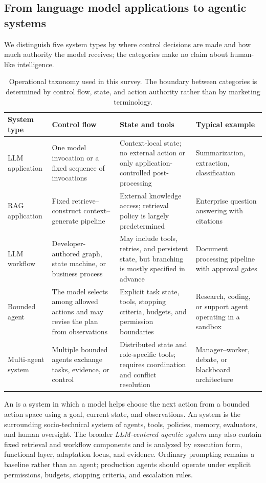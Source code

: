 \subsection{From language model applications to agentic systems}
\label{sec:operational-definitions}

We distinguish five system types by where control decisions are made and how much authority the model receives; the categories make no claim about human-like intelligence.

\begin{table}[t]
\centering
\caption{Operational taxonomy used in this survey. The boundary between categories is determined by control flow, state, and action authority rather than by marketing terminology.}
\label{tab:operational-taxonomy}
\small
\surveytableformat
\begin{tabularx}{\textwidth}{L{2.5cm}Y Y Y}
\toprule
{}\textbf{System type} & \textbf{Control flow} & \textbf{State and tools} & \textbf{Typical example} \\
\midrule
LLM application & One model invocation or a fixed sequence of invocations & Context-local state; no external action or only application-controlled post-processing & Summarization, extraction, classification \\
RAG application & Fixed retrieve--construct context--generate pipeline & External knowledge access; retrieval policy is largely predetermined & Enterprise question answering with citations \\
LLM workflow & Developer-authored graph, state machine, or business process & May include tools, retries, and persistent state, but branching is mostly specified in advance & Document processing pipeline with approval gates \\
Bounded agent & The model selects among allowed actions and may revise the plan from observations & Explicit task state, tools, stopping criteria, budgets, and permission boundaries & Research, coding, or support agent operating in a sandbox \\
Multi-agent system & Multiple bounded agents exchange tasks, evidence, or control & Distributed state and role-specific tools; requires coordination and conflict resolution & Manager--worker, debate, or blackboard architecture \\
\bottomrule
\end{tabularx}
\end{table}

An \agent{} is a system in which a model helps choose the next action from a bounded action space using a goal, current state, and observations. An \agentic{} system is the surrounding socio-technical system of agents, tools, policies, memory, evaluators, and human oversight. The broader \emph{LLM-centered agentic system} may also contain fixed retrieval and workflow components and is analyzed by execution form, functional layer, adaptation locus, and evidence. Ordinary prompting remains a baseline rather than an agent; production agents should operate under explicit permissions, budgets, stopping criteria, and escalation rules.

